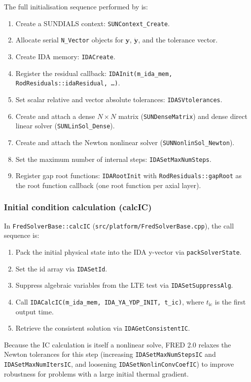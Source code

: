 \documentclass[11pt,a4paper]{article}
\begin{document}
The full initialisation sequence performed by  is:
\begin{enumerate}
  \item Create a SUNDIALS context: \texttt{SUNContext\_Create}.
  \item Allocate serial \texttt{N\_Vector} objects for $\mathbf{y}$, $\dot{\mathbf{y}}$, and the tolerance vector.
  \item Create IDA memory: \texttt{IDACreate}.
  \item Register the residual callback: \texttt{IDAInit(m\_ida\_mem, RodResiduals::idaResidual, \ldots)}.
  \item Set scalar relative and vector absolute tolerances: \texttt{IDASVtolerances}.
  \item Create and attach a dense $N \times N$ matrix (\texttt{SUNDenseMatrix}) and dense direct linear solver (\texttt{SUNLinSol\_Dense}).
  \item Create and attach the Newton nonlinear solver (\texttt{SUNNonlinSol\_Newton}).
  \item Set the maximum number of internal steps: \texttt{IDASetMaxNumSteps}.
  \item Register gap root functions: \texttt{IDARootInit} with \texttt{RodResiduals::gapRoot} as the root function callback (one root function per axial layer).
\end{enumerate}

\subsubsection*{Initial condition calculation (calcIC)}

In \texttt{FredSolverBase::calcIC} (\texttt{src/platform/FredSolverBase.cpp}), the call sequence is:
\begin{enumerate}
  \item Pack the initial physical state into the IDA y-vector via \texttt{packSolverState}.
  \item Set the id array via \texttt{IDASetId}.
  \item Suppress algebraic variables from the LTE test via \texttt{IDASetSuppressAlg}.
  \item Call \texttt{IDACalcIC(m\_ida\_mem, IDA\_YA\_YDP\_INIT, t\_ic)}, where $t_\mathrm{ic}$ is the first output time.
  \item Retrieve the consistent solution via \texttt{IDAGetConsistentIC}.
\end{enumerate}
Because the IC calculation is itself a nonlinear solve, FRED 2.0 relaxes the Newton tolerances for this step (increasing \texttt{IDASetMaxNumStepsIC} and \texttt{IDASetMaxNumItersIC}, and loosening \texttt{IDASetNonlinConvCoefIC}) to improve robustness for problems with a large initial thermal gradient.
\end{document}
